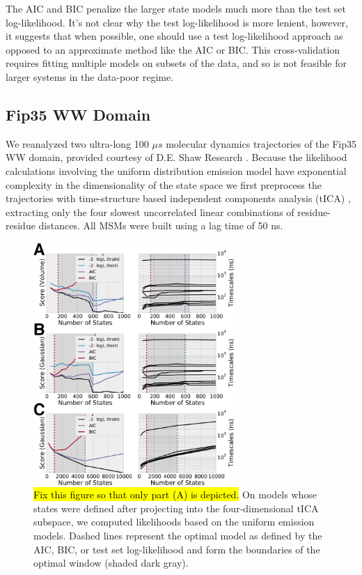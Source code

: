 \documentclass[journal=jpcbfk, layout=traditional, manuscript=article]{achemso}
\begin{document}
The AIC and BIC penalize the larger state models much more than the test set log-likelihood. It's not clear why the test log-likelihood is more lenient, however, it suggests that when possible, one should use a test log-likelihood approach as opposed to an approximate method like the AIC or BIC. This cross-validation requires fitting multiple models on subsets of the data, and so is not feasible for larger systems in the data-poor regime.

\subsection{Fip35 WW Domain}

We reanalyzed two ultra-long 100 $\mu s$ molecular dynamics trajectories of the Fip35 WW domain\cite{Liu2008Experimental}, provided courtesy of D.E. Shaw Research \cite{Shaw2010Atomic}. Because the likelihood calculations involving the uniform distribution emission model have exponential complexity in the dimensionality of the state space we first preprocess the trajectories with time-structure based independent components analysis (tICA) \cite{Schwantes2013Improvements, Perez2013Identification}, extracting only the four slowest uncorrelated linear combinations of residue-residue distances. All MSMs were built using a lag time of 50 ns.

\begin{figure}
\centering
\includegraphics[width=3in]{figs_final/ww_likes.png}
\caption{\hl{Fix this figure so that only part (A) is depicted.} On models whose states were defined after projecting into the four-dimensional tICA subspace, we computed likelihoods based on the uniform emission models. Dashed lines represent the optimal model as defined by the AIC, BIC, or test set log-likelihood and form the boundaries of the optimal window (shaded dark gray). \label{fig:ww}}
\end{figure}
\end{document}
